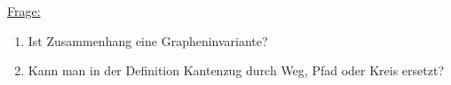 \\\\
\underline{Frage:}
\begin{enumerate}
	\item Ist Zusammenhang eine Grapheninvariante?
	\item Kann man in der Definition Kantenzug durch Weg, Pfad oder Kreis ersetzt?
\end{enumerate}
